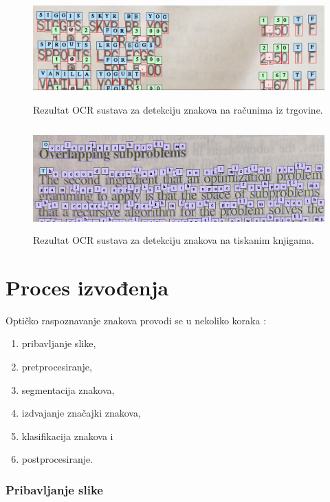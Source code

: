 \documentclass[times, utf8, zavrsni]{fer}
\begin{document}
\begin{figure}[htb]
    \centering
    \includegraphics[height=4cm]{images/receipt-example-01.png}
    \caption{Rezultat OCR sustava za detekciju znakova na računima iz trgovine.}
    \label{fig:receipt-example-01}
\end{figure}

\begin{figure}[htb]
    \centering
    \includegraphics[height=4cm]{images/book-example-01.png}
    \caption{Rezultat OCR sustava za detekciju znakova na tiskanim knjigama.}
    \label{fig:book-example-01}
\end{figure}

\pagebreak

\section{Proces izvođenja}

Optičko raspoznavanje znakova provodi se u nekoliko koraka \citep{DBLP:journals/corr/abs-1710-05703} \citep{kaur2016survey}:
\begin{enumerate}
    \item pribavljanje slike,
    \item pretprocesiranje,
    \item segmentacija znakova,
    \item izdvajanje značajki znakova,
    \item klasifikacija znakova i
    \item postprocesiranje.
\end{enumerate}

\subsubsection{Pribavljanje slike}
\end{document}

